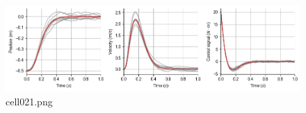 \begin{figure}[ht]
	\centering
	\includegraphics[scale=0.8, max width=\linewidth]{./fig/motor-learning/infinite-horizon-ofc/cell021.png}
	\caption{cell021.png}
	\label{cell021.png}
\end{figure}